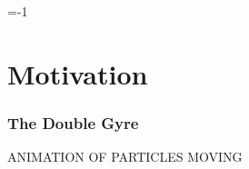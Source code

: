 \documentclass[english,svgnames,notes=hide,14pt]{beamer}
\title{\large\presentationtitle}
\author{Liam Blake\\
		\small Supervised by A/ Prof. Sanjeeva Balasuriya \& Dr. John Maclean\\
		\small The University of Adelaide
	}
\date{}
\makeatletter
\newcommand{\sectslide}[1]{
\section{#1}
\begin{frame}
	\centering\Large
	\thesection.\, #1
\end{frame}
}
\newcommand{\setnextsection}[1]{%
  \setcounter{section}{\numexpr#1-1\relax}%
  \beamer@tocsectionnumber=\numexpr#1-1\relax\space}
\makeatother
\begin{document}

\begin{frame}
  \titlepage
\end{frame}







\setnextsection{0}
\section{Motivation}
\begin{frame}
\frametitle{The Double Gyre}	
	
	ANIMATION OF PARTICLES MOVING

\end{frame}



%	
%










\end{document}
